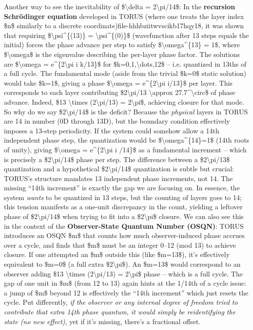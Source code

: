 \documentclass[]{article}
\begin{document}
Another way to see the inevitability of \$\textbackslash{}delta =
2\textbackslash{}pi/14\$: In the \textbf{recursion Schrödinger equation}
developed in TORUS (where one treats the layer index \$n\$ similarly to
a discrete coordinate)​file-hhhbziitwvscikb17hqy18, it was shown that
requiring \$\textbackslash{}psi\^{}\{(13)\} =
\textbackslash{}psi\^{}\{(0)\}\$ (wavefunction after 13 steps equals the
initial) forces the phase advance per step to satisfy
\$\textbackslash{}omega\^{}\{13\} = 1\$, where \$\textbackslash{}omega\$
is the eigenvalue describing the per-layer phase factor​. The solutions
are \$\textbackslash{}omega = e\^{}\{2\textbackslash{}pi i k/13\}\$ for
\$k=0,1,\textbackslash{}dots,12\$ -- i.e. quantized in 13ths of a full
cycle. The fundamental mode (aside from the trivial \$k=0\$ static
solution) would take \$k=1\$, giving a phase \$\textbackslash{}omega =
e\^{}\{2\textbackslash{}pi i/13\}\$ per layer​. This corresponds to each
layer contributing \$2\textbackslash{}pi/13 \textbackslash{}approx
27.7\^{}\textbackslash{}circ\$ of phase advance. Indeed, \$13
\textbackslash{}times (2\textbackslash{}pi/13) = 2\textbackslash{}pi\$,
achieving closure for that mode. So why do we say
\$2\textbackslash{}pi/14\$ is the deficit? Because the \emph{physical}
layers in TORUS are 14 in number (0D through 13D), but the boundary
condition effectively imposes a 13-step periodicity. If the system could
somehow allow a 14th independent phase step, the quantization would be
\$\textbackslash{}omega\^{}\{14\}=1\$ (14th roots of unity), giving
\$\textbackslash{}omega = e\^{}\{2\textbackslash{}pi i /14\}\$ as a
fundamental increment -- which is precisely a \$2\textbackslash{}pi/14\$
phase per step. The difference between a \$2\textbackslash{}pi/13\$
quantization and a hypothetical \$2\textbackslash{}pi/14\$ quantization
is subtle but crucial: TORUS's structure mandates 13 independent phase
increments, not 14. The missing ``14th increment'' is exactly the gap we
are focusing on. In essence, the system \emph{wants} to be quantized in
13 steps, but the counting of layers goes to 14; this tension manifests
as a one-unit discrepancy in the count, yielding a leftover phase of
\$2\textbackslash{}pi/14\$ when trying to fit into a
\$2\textbackslash{}pi\$ closure. We can also see this in the context of
the \textbf{Observer-State Quantum Number (OSQN)}: TORUS introduces an
OSQN \$m\$ that counts how much observer-induced phase accrues over a
cycle, and finds that \$m\$ must be an integer 0--12 (mod 13) to achieve
closure​. If one attempted an \$m\$ outside this (like \$m=13\$), it's
effectively equivalent to \$m=0\$ (a full extra
\$2\textbackslash{}pi\$). An \$m=13\$ would correspond to an observer
adding \$13 \textbackslash{}times (2\textbackslash{}pi/13) =
2\textbackslash{}pi\$ phase -- which is a full cycle. The gap of one
unit in \$m\$ (from 12 to 13) again hints at the 1/14th of a cycle
issue: a jump of \$m\$ beyond 12 is effectively the ``14th increment''
which just resets the cycle. Put differently, \emph{if the observer or
any internal degree of freedom tried to contribute that extra 14th phase
quantum, it would simply be reidentifying the state (no new effect)},
yet if it's missing, there's a fractional offset.
\end{document}
